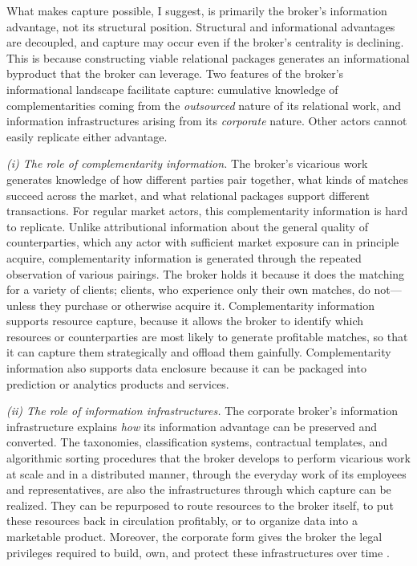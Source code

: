 \documentclass[
]{article}
\begin{document}
What makes capture possible, I suggest, is primarily the broker's information advantage, not its structural position. Structural and informational advantages are decoupled, and capture may occur even if the broker's centrality is declining. This is because constructing viable relational packages generates an informational byproduct that the broker can leverage. Two features of the broker's informational landscape facilitate capture: cumulative knowledge of complementarities coming from the \emph{outsourced} nature of its relational work, and information infrastructures arising from its \emph{corporate} nature. Other actors cannot easily replicate either advantage.

\emph{(i) The role of complementarity information.} The broker's vicarious work generates knowledge of how different parties pair together, what kinds of matches succeed across the market, and what relational packages support different transactions. For regular market actors, this complementarity information is hard to replicate. Unlike attributional information about the general quality of counterparties, which any actor with sufficient market exposure can in principle acquire, complementarity information is generated through the repeated observation of various pairings. The broker holds it because it does the matching for a variety of clients; clients, who experience only their own matches, do not---unless they purchase or otherwise acquire it. Complementarity information supports resource capture, because it allows the broker to identify which resources or counterparties are most likely to generate profitable matches, so that it can capture them strategically and offload them gainfully. Complementarity information also supports data enclosure because it can be packaged into prediction or analytics products and services.

\emph{(ii) The role of information infrastructures.} The corporate broker's information infrastructure explains \emph{how} its information advantage can be preserved and converted. The taxonomies, classification systems, contractual templates, and algorithmic sorting procedures that the broker develops to perform vicarious work at scale and in a distributed manner, through the everyday work of its employees and representatives, are also the infrastructures through which capture can be realized. They can be repurposed to route resources to the broker itself, to put these resources back in circulation profitably, or to organize data into a marketable product. Moreover, the corporate form gives the broker the legal privileges required to build, own, and protect these infrastructures over time \autocite{colemanAsymmetricSociety1982,pistorCodeCapitalHow2019}.
\end{document}
